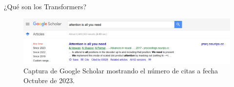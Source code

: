 \begin{frame}{¿Qué son los Transformers?}

\begin{figure}
    \centering
    \includegraphics[width=1\textwidth]{Slides/figures/02_Metodos_Generativos/transf-attention-is-all-you-need-citas.png}
    \caption{Captura de Google Scholar mostrando el número de citas a fecha Octubre de 2023.}
\end{figure}

\end{frame}


